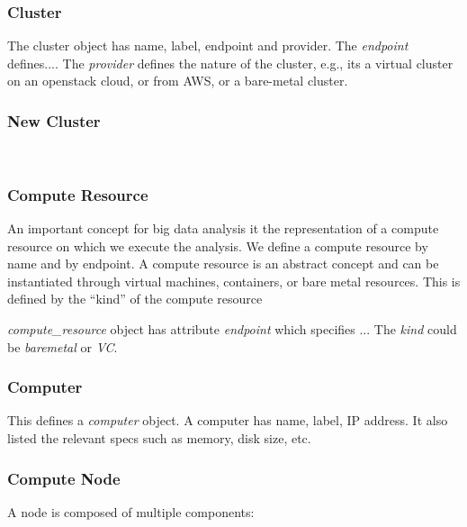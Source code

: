 \documentclass[10pt]{article}
\begin{document}
\subsubsection{Cluster}

The cluster object has name, label, endpoint and provider. The
\textit{endpoint} defines....  The \textit{provider} defines the
nature of the cluster, e.g., its a virtual cluster on an openstack
cloud, or from AWS, or a bare-metal cluster.



\subsubsection{New Cluster}

\
\subsubsection{Compute Resource}

An important concept for big data analysis it the representation of a
compute resource on which we execute the analysis. We define a compute
resource by name and by endpoint. A compute resource is an abstract
concept and can be instantiated through virtual machines, containers,
or bare metal resources. This is defined by the “kind” of the compute
resource 

\textit{compute\_resource} object has attribute \textit{endpoint} which
specifies ... The \textit{kind} could be \textit{baremetal} or \textit{VC}.


\subsubsection{Computer}

This defines a \textit{computer} object. A computer has name, label,
IP address. It also listed the relevant specs such as memory, disk
size, etc.



\subsubsection{Compute Node}

A node is composed of multiple components:
\end{document}

